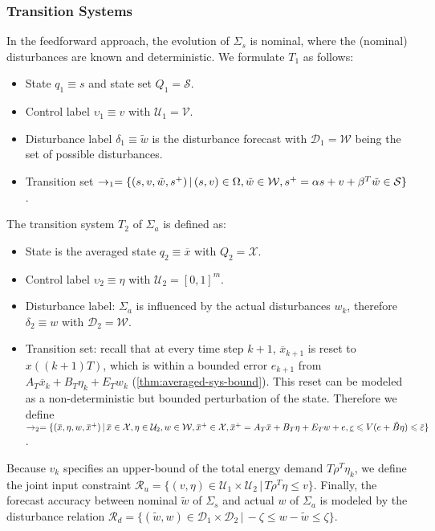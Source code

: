\subsubsection{Transition Systems}
\label{sec:abstraction-gs:feedforward:Ts}

In the feedforward approach, the evolution of $\Sigma_{s}$ is nominal, where the (nominal) disturbances are known and deterministic.
We formulate $T_{1}$ as follows:
\begin{itemize}
\item State $q_{1} \equiv s$ and state set $Q_{1} = \mathcal{S}$.
\item Control label $\upsilon_{1} \equiv v$ with $\mathcal{U}_{1} = \mathcal{V}$.
\item Disturbance label $\delta_{1} \equiv \tilde{w}$ is the disturbance forecast with $\mathcal{D}_{1} = \mathcal{W}$ being the set of possible disturbances.
\item Transition set $\rightarrow_{1} = \{ (s, v, \tilde{w}, s^{+}) \,|\, (s,v) \in \Omega,\allowbreak \tilde{w} \in \WSet, %
  \allowbreak s^{+} = \alpha s + v + \beta^{T} \tilde{w} \in \SSet\}$. %
\end{itemize}
%
The transition system $T_{2}$ of $\Sigma_{a}$ is defined as:
\begin{itemize}
\item State is the averaged state $q_{2} \equiv \overbar{x}$ with $Q_{2} = \mathcal{X}$.
\item Control label $\upsilon_{2} \equiv \eta$ with $\mathcal{U}_{2} = [0,1]^{m}$.
\item Disturbance label: $\Sigma_{a}$ %
  is influenced by the actual disturbances $w_{k}$, therefore $\delta_{2} \equiv w$ with $\mathcal{D}_{2} = \mathcal{W}$.
\item Transition set: recall that at every time step $k+1$, $\overbar{x}_{k+1}$ is reset to $x((k+1)T)$, which is within a bounded error $e_{k+1}$ from $A_{T} \overbar{x}_{k} + B_{T} \eta_k + E_{T} w_{k}$ (\cf \cref{thm:averaged-sys-bound}).  This reset can be modeled as a non-deterministic but bounded perturbation of the state.  Therefore we define $\rightarrow_{2} = \{ (\overbar{x}, \eta, w, \overbar{x}^{+}) \,|\, \overbar{x} \in \XSet, \eta \in \mathcal{U}_{2}, w \in \mathcal{W},\allowbreak \overbar{x}^{+} \in \XSet,\allowbreak \overbar{x}^{+} = A_{T} \overbar{x}+ B_{T} \eta + E_{T} w + e,\allowbreak 
\underline{\varepsilon} \leqslant V (e + \tilde{B} \eta) \leqslant \overbar{\varepsilon}\}$.
\end{itemize}
%
Because $v_{k}$ specifies an upper-bound of the total energy demand $T \rho^{T} \eta_{k}$, we define the joint input constraint $\mathcal{R}_{u} = \{ (v, \eta) \in \mathcal{U}_{1} \times \mathcal{U}_{2} \,|\, T \rho^{T} \eta \leq v \}$.
Finally, the forecast accuracy between nominal $\tilde{w}$ of $\Sigma_{s}$ and actual $w$ of $\Sigma_{a}$ is modeled by the disturbance relation $\mathcal{R}_{d} = \{ (\tilde{w}, w) \in \mathcal{D}_{1} \times \mathcal{D}_{2} \,|\, -\zeta \leqslant w - \tilde{w} \leqslant \zeta \}$.


